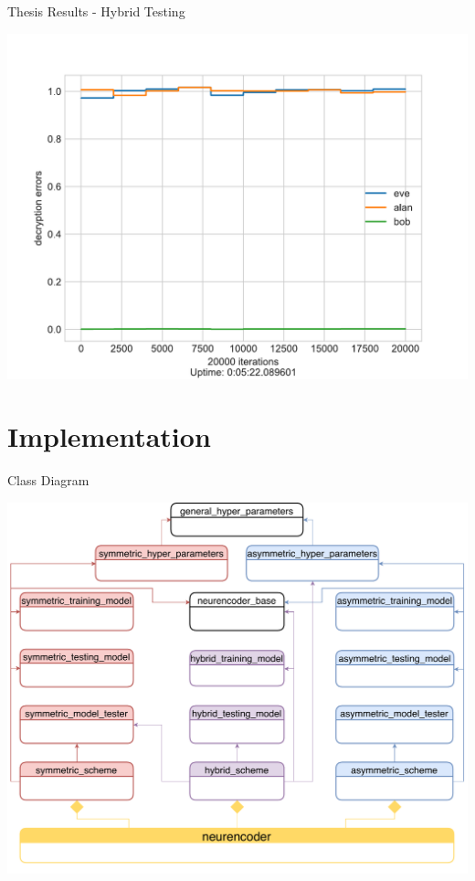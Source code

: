 \documentclass{beamer}
\begin{document}
		\begin{frame}{Thesis Results - Hybrid Testing}
			\begin{center}
				\includegraphics[height=0.9\textheight]{neurencoder-hybrid-testing}
			\end{center}
		\end{frame}	
		\section{Implementation}
		\begin{frame}{Class Diagram}
			\begin{center}
				\includegraphics[height=0.9\textheight]{classDiagram-present}
			\end{center}
		\end{frame}	
\end{document}
